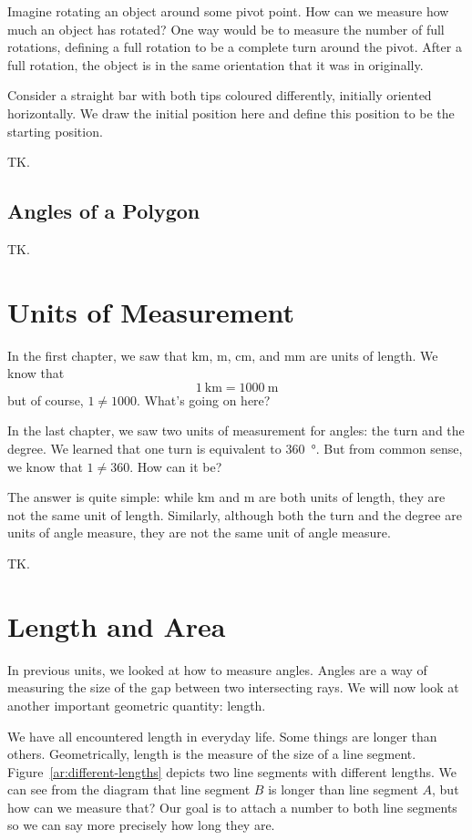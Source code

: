 \documentclass[a4paper,10pt]{report}
\begin{document}
Imagine rotating an object around some pivot point. How can we measure how much
an object has rotated? One way would be to measure the number of full rotations,
defining a full rotation to be a complete turn around the pivot. After a full
rotation, the object is in the same orientation that it was in originally.

Consider a straight bar with both tips coloured differently, initially oriented
horizontally. We draw the initial position here and define this position to be
the starting position.

TK.

\section{Angles of a Polygon}

TK.

\chapter{Units of Measurement}

In the first chapter, we saw that \si{\kilo\metre}, \si{\metre},
\si{\centi\metre}, and \si{\milli\metre} are units of length. We know that \[
  \SI{1}{\kilo\metre} = \SI{1000}{\metre}
\] but of course, \(1\ne1000\). What's going on here?

In the last chapter, we saw two units of measurement for angles: the turn and
the degree. We learned that one turn is equivalent to \SI{360}{\degree}. But
from common sense, we know that \(1 \ne 360\). How can it be?

The answer is quite simple: while \si{\kilo\metre} and \si{\metre} are both
units of length, they are not the same unit of length. Similarly, although both
the turn and the degree are units of angle measure, they are not the same unit
of angle measure.

TK.

\chapter{Length and Area}

In previous units, we looked at how to measure angles. Angles are a way of
measuring the size of the gap between two intersecting rays. We will now look
at another important geometric quantity: length.

We have all encountered length in everyday life. Some things are longer than
others. Geometrically, length is the measure of the size of a line segment.
Figure~\ref{ar:different-lengths} depicts two line segments with different
lengths. We can see from the diagram that line segment \(B\) is longer than
line segment \(A\), but how can we measure that? Our goal is to attach a number
to both line segments so we can say more precisely how long they are.
\end{document}
